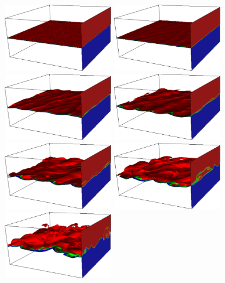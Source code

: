 \documentclass[final]{siamltex}
\begin{document}
\begin{figure}
\begin{center}
\includegraphics[width=1.9in]{KHLM_3d0}
\includegraphics[width=1.9in]{KHLM_3d1}
\includegraphics[width=1.9in]{KHLM_3d2}
\includegraphics[width=1.9in]{KHLM_3d3}
\includegraphics[width=1.9in]{KHLM_3d4}
\includegraphics[width=1.9in]{KHLM_3d5}
\includegraphics[width=1.9in]{KHLM_3d6}

\end{center}
\end{figure}
\end{document}

